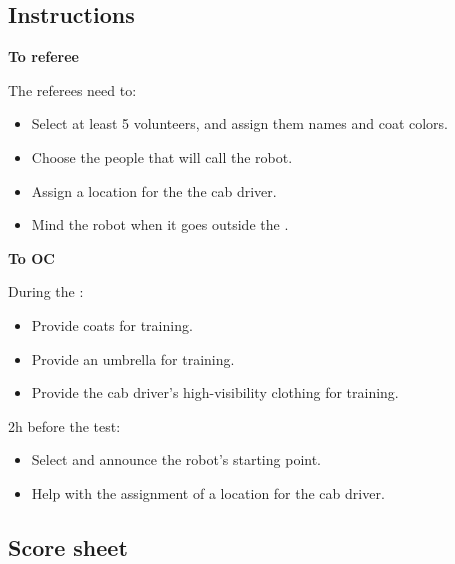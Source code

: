\subsection*{Instructions}

\textbf{To referee}

The referees need to:
\begin{itemize}
	\item Select at least 5 volunteers, and assign them names and coat colors.
	\item Choose the people that will call the robot.
	\item Assign a location for the the cab driver.
	\item Mind the robot when it goes outside the \Arena{}.
\end{itemize}

\textbf{To OC}

During the \SetupDays:
\begin{itemize}
	\item Provide coats for training.
	\item Provide an umbrella for training.
	\item Provide the cab driver's high-visibility clothing for training.
\end{itemize}

2h before the test:
\begin{itemize}
	\item Select and announce the robot's starting point.
	\item Help with the assignment of a location for the cab driver.
\end{itemize}

\subsection*{Score sheet}



